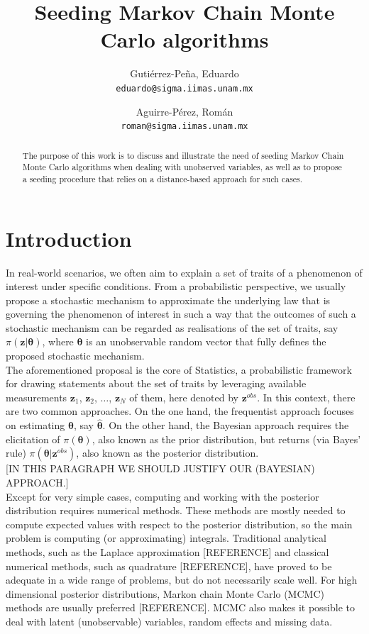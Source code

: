 \documentclass[12pt,a4paper]{article}
\title{Seeding Markov Chain Monte Carlo algorithms}
\author{
  Guti\'errez-Pe\~na, Eduardo\\
  \texttt{eduardo@sigma.iimas.unam.mx}
  \and
  Aguirre-P\'erez, Rom\'an\\
  \texttt{roman@sigma.iimas.unam.mx}
}
\begin{document}
\maketitle

\begin{abstract}
The purpose of this work is to discuss and illustrate the need of seeding Markov Chain Monte Carlo algorithms when dealing with unobserved variables, as well as to propose a seeding procedure that relies on a distance-based approach for such cases.  
\end{abstract}

\section{Introduction}
In real-world scenarios, we often aim to explain a set of traits of a phenomenon of interest under specific conditions. From a probabilistic perspective, we usually propose a stochastic mechanism to approximate the underlying law that is governing the phenomenon of interest in such a way that the outcomes of such a stochastic mechanism can be regarded as realisations of the set of traits, say $\pi(\mathbf{z} \vert \boldsymbol{\theta})$, where $\boldsymbol{\theta}$ is an unobservable random vector that fully defines the proposed stochastic mechanism.\\

The aforementioned proposal is the core of Statistics, a probabilistic framework for drawing statements about the set of traits by leveraging available measurements $\mathbf{z}_{1}$, $\mathbf{z}_{2}$, $\ldots$, $\mathbf{z}_{N}$ of them, here denoted by $\mathbf{z}^{obs}$. In this context, there are two common approaches. On the one hand, the frequentist approach focuses on estimating $\boldsymbol{\theta}$, say $\boldsymbol{\widehat{\theta}}$. On the other hand, the Bayesian approach \citep{BS1994} requires the elicitation of $\pi(\boldsymbol{\theta})$, also known as the prior distribution, but returns (via Bayes' rule) $\pi(\boldsymbol{\theta} \vert \mathbf{z}^{obs})$, also known as the posterior distribution.\\

[IN THIS PARAGRAPH WE SHOULD JUSTIFY OUR (BAYESIAN) APPROACH.]\\

Except for very simple cases, computing and working with the posterior distribution requires numerical methods. These methods are mostly needed to compute expected values with respect to the posterior distribution, so the main problem is computing (or approximating) integrals. Traditional analytical methods, such as the Laplace approximation [REFERENCE] and classical numerical methods, such as quadrature [REFERENCE], have proved to be adequate in a wide range of problems, but do not necessarily scale well. For high dimensional posterior distributions, Markon chain Monte Carlo (MCMC) methods are usually preferred [REFERENCE]. MCMC also makes it possible to deal with latent (unobservable) variables, random effects and missing data.\\
\end{document}
